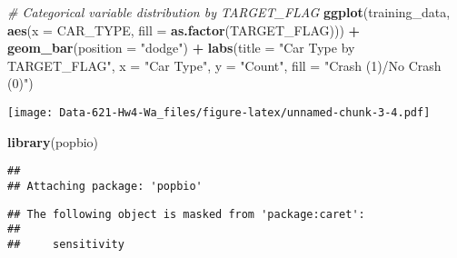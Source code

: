 \documentclass[
]{article}
\newenvironment{Shaded}{\begin{snugshade}}{\end{snugshade}}
\newcommand{\AttributeTok}[1]{\textcolor[rgb]{0.13,0.29,0.53}{#1}}
\newcommand{\CommentTok}[1]{\textcolor[rgb]{0.56,0.35,0.01}{\textit{#1}}}
\newcommand{\FunctionTok}[1]{\textcolor[rgb]{0.13,0.29,0.53}{\textbf{#1}}}
\newcommand{\NormalTok}[1]{#1}
\newcommand{\SpecialCharTok}[1]{\textcolor[rgb]{0.81,0.36,0.00}{\textbf{#1}}}
\newcommand{\StringTok}[1]{\textcolor[rgb]{0.31,0.60,0.02}{#1}}
\begin{document}
\begin{Shaded}
\begin{Highlighting}[]
\CommentTok{\# Categorical variable distribution by TARGET\_FLAG}
\FunctionTok{ggplot}\NormalTok{(training\_data, }\FunctionTok{aes}\NormalTok{(}\AttributeTok{x =}\NormalTok{ CAR\_TYPE, }\AttributeTok{fill =} \FunctionTok{as.factor}\NormalTok{(TARGET\_FLAG))) }\SpecialCharTok{+}
  \FunctionTok{geom\_bar}\NormalTok{(}\AttributeTok{position =} \StringTok{"dodge"}\NormalTok{) }\SpecialCharTok{+}
  \FunctionTok{labs}\NormalTok{(}\AttributeTok{title =} \StringTok{"Car Type by TARGET\_FLAG"}\NormalTok{, }\AttributeTok{x =} \StringTok{"Car Type"}\NormalTok{, }\AttributeTok{y =} \StringTok{"Count"}\NormalTok{, }\AttributeTok{fill =} \StringTok{"Crash (1)/No Crash (0)"}\NormalTok{)}
\end{Highlighting}
\end{Shaded}

\texttt{[image: Data-621-Hw4-Wa\_files/figure-latex/unnamed-chunk-3-4.pdf]}

\begin{Shaded}
\begin{Highlighting}[]
\FunctionTok{library}\NormalTok{(popbio)}
\end{Highlighting}
\end{Shaded}

\begin{verbatim}
## 
## Attaching package: 'popbio'
\end{verbatim}

\begin{verbatim}
## The following object is masked from 'package:caret':
## 
##     sensitivity
\end{verbatim}
\end{document}
